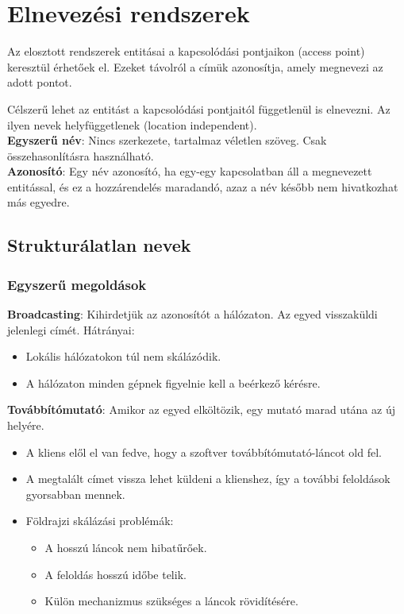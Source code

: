 \documentclass[margin=0px]{article}
\begin{document}
	\section{Elnevezési rendszerek}
	
	Az elosztott rendszerek entitásai a kapcsolódási pontjaikon (access point) keresztül érhetőek el. Ezeket távolról
	a címük azonosítja, amely megnevezi az adott pontot.
	
	Célszerű lehet az entitást a kapcsolódási pontjaitól függetlenül is elnevezni. Az ilyen nevek helyfüggetlenek (location
	independent).\\
	
	\noindent \textbf{Egyszerű név}: Nincs szerkezete, tartalmaz véletlen szöveg. Csak összehasonlításra használható.\\
	
	\noindent \textbf{Azonosító}: Egy név azonosító, ha egy-egy kapcsolatban áll a megnevezett entitással, és ez 
	a hozzárendelés maradandó, azaz a név később nem hivatkozhat más egyedre.
	
	\subsection{Strukturálatlan nevek}
	
	\subsubsection{Egyszerű megoldások}
	
	\noindent \textbf{Broadcasting}: Kihirdetjük az azonosítót a hálózaton. Az egyed visszaküldi jelenlegi címét.
	Hátrányai:
	\begin{itemize}
		\item	Lokális hálózatokon túl nem skálázódik.
		
		\item	A hálózaton minden gépnek figyelnie kell a beérkező kérésre.
	\end{itemize}
	
	\noindent \textbf{Továbbítómutató}: Amikor az egyed elköltözik, egy mutató marad utána az új helyére.
	\begin{itemize}
		\item	A kliens elől el van fedve, hogy a szoftver továbbítómutató-láncot old fel.
		\item	A megtalált címet vissza lehet küldeni a klienshez, így a további feloldások gyorsabban mennek.
		\item	Földrajzi skálázási problémák:
		\begin{itemize}
			\item	A hosszú láncok nem hibatűrőek.
			\item	A feloldás hosszú időbe telik.
			\item	Külön mechanizmus szükséges a láncok rövidítésére.
		\end{itemize}
	\end{itemize}
	
\end{document}
